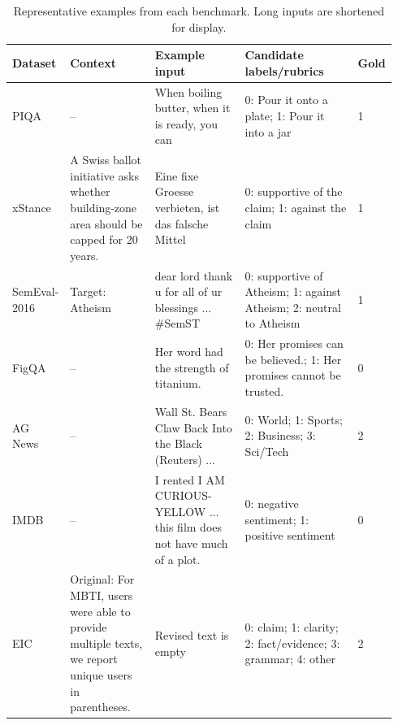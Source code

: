\begin{table}[t]
\centering
\scriptsize
\begin{tabular}{p{0.10\linewidth}p{0.23\linewidth}p{0.25\linewidth}p{0.31\linewidth}p{0.05\linewidth}}
\toprule
\textbf{Dataset} & \textbf{Context} & \textbf{Example input} & \textbf{Candidate labels/rubrics} & \textbf{Gold} \\
\midrule
PIQA & -- & When boiling butter, when it is ready, you can & 0: Pour it onto a plate; 1: Pour it into a jar & 1 \\
xStance & A Swiss ballot initiative asks whether building-zone area should be capped for 20 years. & Eine fixe Groesse verbieten, ist das falsche Mittel & 0: supportive of the claim; 1: against the claim & 1 \\
SemEval-2016 & Target: Atheism & dear lord thank u for all of ur blessings ... \#SemST & 0: supportive of Atheism; 1: against Atheism; 2: neutral to Atheism & 1 \\
FigQA & -- & Her word had the strength of titanium. & 0: Her promises can be believed.; 1: Her promises cannot be trusted. & 0 \\
AG News & -- & Wall St. Bears Claw Back Into the Black (Reuters) ... & 0: World; 1: Sports; 2: Business; 3: Sci/Tech & 2 \\
IMDB & -- & I rented I AM CURIOUS-YELLOW ... this film does not have much of a plot. & 0: negative sentiment; 1: positive sentiment & 0 \\
EIC & Original: For MBTI, users were able to provide multiple texts, we report unique users in parentheses. & Revised text is empty & 0: claim; 1: clarity; 2: fact/evidence; 3: grammar; 4: other & 2 \\
\bottomrule
\end{tabular}
\caption{Representative examples from each benchmark. Long inputs are shortened for display.}
\label{tab:non_asag_examples}
\end{table}

